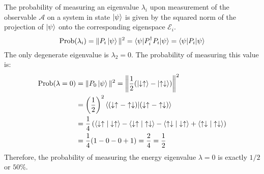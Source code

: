 \documentclass[11pt,a4paper]{article}
\begin{document}
The probability of measuring an eigenvalue $\lambda_i$ upon measurement of the observable $\mathcal{A}$ on a system in state $\ket{\psi}$ is given by the squared norm of the projection of $\ket{\psi}$ onto the corresponding eigenspace $\mathcal{E}_i$.
\begin{equation}
    \text{Prob}(\lambda_i) = \| P_i \ket{\psi} \|^2 = \braket{\psi|P_i^{\dagger}P_i|\psi} = \braket{\psi|P_i|\psi}
\end{equation}
The only degenerate eigenvalue is $\lambda_2 = 0$. The probability of measuring this value is:
\begin{align}
    \text{Prob}(\lambda=0) &= \| P_0 \ket{\psi} \|^2 = \left\| \frac{1}{2}(\ket{\downarrow\uparrow} - \ket{\uparrow\downarrow}) \right\|^2 \nonumber \\
    &= \left(\frac{1}{2}\right)^2 \braket{(\downarrow\uparrow - \uparrow\downarrow)|(\downarrow\uparrow - \uparrow\downarrow)} \nonumber \\
    &= \frac{1}{4} \left( \braket{\downarrow\uparrow|\downarrow\uparrow} - \braket{\downarrow\uparrow|\uparrow\downarrow} - \braket{\uparrow\downarrow|\downarrow\uparrow} + \braket{\uparrow\downarrow|\uparrow\downarrow} \right) \nonumber \\
    &= \frac{1}{4} (1 - 0 - 0 + 1) = \frac{2}{4} = \frac{1}{2}
\end{align}
Therefore, the probability of measuring the energy eigenvalue $\lambda = 0$ is exactly $1/2$ or $50\%$.
\end{document}
